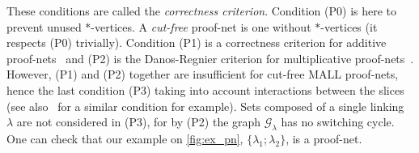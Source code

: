 \documentclass{lmcs}
\newcommand*{\G}{\mathcal{G}}
\begin{document}
These conditions are called the \emph{correctness criterion}.
Condition (P0) is here to prevent unused $\ast$-vertices.
A \emph{cut-free} proof-net is one without $\ast$-vertices (it respects (P0) trivially).
Condition (P1) is a correctness criterion for additive proof-nets~\cite{mallpnlong} and (P2) is the Danos-Regnier criterion for multiplicative proof-nets~\cite{structmult}.
However, (P1) and (P2) together are insufficient for cut-free MALL proof-nets, hence the last condition (P3) taking into account interactions between the slices (see also~\cite{jumpadd} for a similar condition for example).
Sets composed of a single linking $\lambda$ are not considered in (P3), for by (P2) the graph $\G_\lambda$ has no switching cycle.
One can check that our example on \autoref{fig:ex_pn}, $\{\lambda_1;\lambda_2\}$, is a proof-net.
\end{document}
